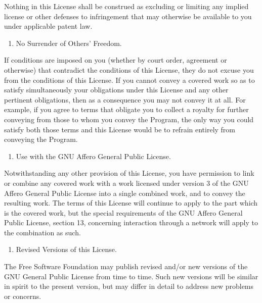 \documentclass[letterpaper,10pt,english]{sphinxmanual}
\begin{document}
Nothing in this License shall be construed as excluding or limiting
any implied license or other defenses to infringement that may
otherwise be available to you under applicable patent law.
\begin{enumerate}
%
\setcounter{enumi}{11}
\item {} 
No Surrender of Others’ Freedom.

\end{enumerate}

If conditions are imposed on you (whether by court order, agreement or
otherwise) that contradict the conditions of this License, they do not
excuse you from the conditions of this License.  If you cannot convey a
covered work so as to satisfy simultaneously your obligations under this
License and any other pertinent obligations, then as a consequence you may
not convey it at all.  For example, if you agree to terms that obligate you
to collect a royalty for further conveying from those to whom you convey
the Program, the only way you could satisfy both those terms and this
License would be to refrain entirely from conveying the Program.
\begin{enumerate}
%
\setcounter{enumi}{12}
\item {} 
Use with the GNU Affero General Public License.

\end{enumerate}

Notwithstanding any other provision of this License, you have
permission to link or combine any covered work with a work licensed
under version 3 of the GNU Affero General Public License into a single
combined work, and to convey the resulting work.  The terms of this
License will continue to apply to the part which is the covered work,
but the special requirements of the GNU Affero General Public License,
section 13, concerning interaction through a network will apply to the
combination as such.
\begin{enumerate}
%
\setcounter{enumi}{13}
\item {} 
Revised Versions of this License.

\end{enumerate}

The Free Software Foundation may publish revised and/or new versions of
the GNU General Public License from time to time.  Such new versions will
be similar in spirit to the present version, but may differ in detail to
address new problems or concerns.
\end{document}
